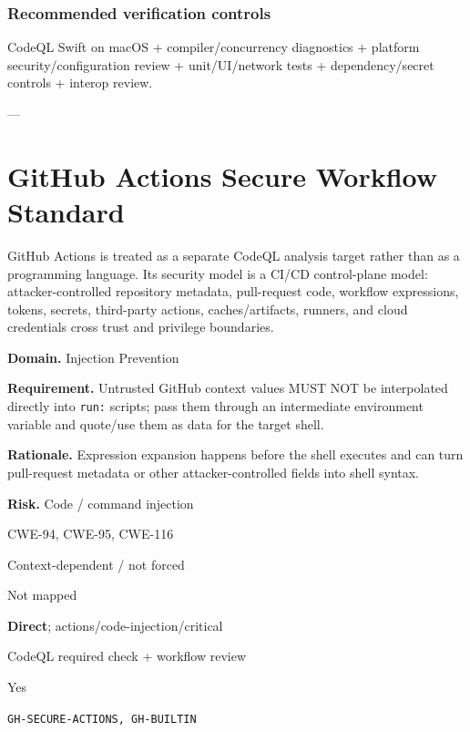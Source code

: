 \documentclass[10pt,letterpaper]{article}
\newcommand{\code}[1]{\texttt{\small #1}}
\newcommand{\prioritybadge}[2]{\tcbox[on line,boxrule=0pt,arc=1.2mm,boxsep=0.7mm,left=1mm,right=1mm,top=0.4mm,bottom=0.4mm,colback=#2!12,coltext=#2]{\scriptsize\bfseries #1}}
\begin{document}
\subsubsection*{Recommended verification controls}
CodeQL Swift on macOS + compiler/concurrency diagnostics + platform security/configuration review + unit/UI/network tests + dependency/secret controls + interop review.


---
\clearpage
\section{GitHub Actions Secure Workflow Standard}
GitHub Actions is treated as a separate CodeQL analysis target rather than as a programming language. Its security model is a CI/CD control-plane model: attacker-controlled repository metadata, pull-request code, workflow expressions, tokens, secrets, third-party actions, caches/artifacts, runners, and cloud credentials cross trust and privilege boundaries.

\begin{rulebox}[title={\texttt{SCS-ACTIONS-INJ-001} \hfill \prioritybadge{Critical Control}{Critical}}]
\textbf{Domain.} Injection Prevention

\textbf{Requirement.} Untrusted GitHub context values MUST NOT be interpolated directly into \code{run:} scripts; pass them through an intermediate environment variable and quote/use them as data for the target shell.

\textbf{Rationale.} Expression expansion happens before the shell executes and can turn pull-request metadata or other attacker-controlled fields into shell syntax.

\textbf{Risk.} Code / command injection

\begin{description}[leftmargin=2.65cm,labelwidth=2.3cm,style=nextline,itemsep=1pt,topsep=3pt]
  \item[CWE] CWE-94, CWE-95, CWE-116
  \item[OWASP] Context-dependent / not forced
  \item[CERT] Not mapped
  \item[CodeQL] \textbf{Direct}; actions/code-injection/critical
  \item[Enforcement] CodeQL required check + workflow review
  \item[Automation] Yes
  \item[Sources] \texttt{GH-SECURE-ACTIONS, GH-BUILTIN}
\end{description}
\end{rulebox}
\end{document}
